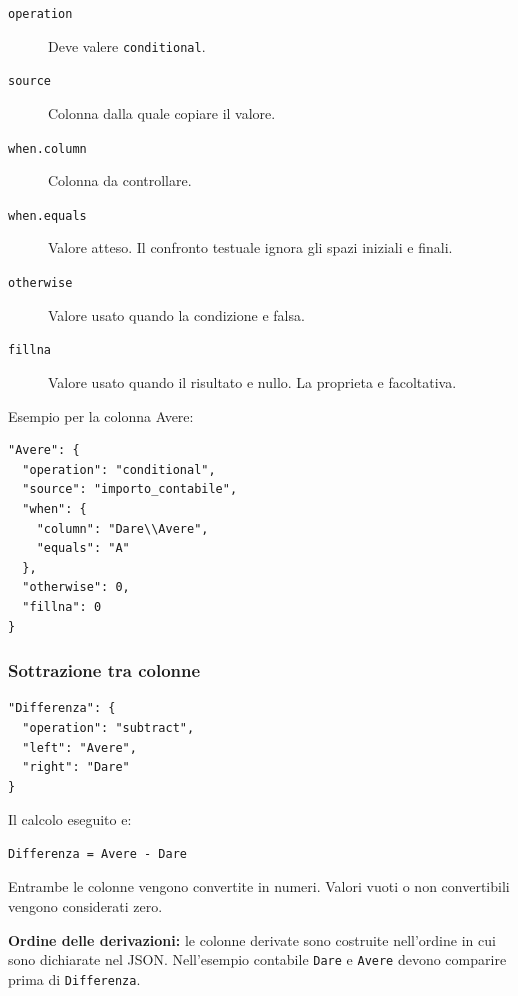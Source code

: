 \begin{description}
  \item[\texttt{operation}]
  Deve valere \texttt{conditional}.

  \item[\texttt{source}]
  Colonna dalla quale copiare il valore.

  \item[\texttt{when.column}]
  Colonna da controllare.

  \item[\texttt{when.equals}]
  Valore atteso. Il confronto testuale ignora gli spazi iniziali e finali.

  \item[\texttt{otherwise}]
  Valore usato quando la condizione e falsa.

  \item[\texttt{fillna}]
  Valore usato quando il risultato e nullo. La proprieta e facoltativa.
\end{description}

Esempio per la colonna Avere:

\begin{lstlisting}
"Avere": {
  "operation": "conditional",
  "source": "importo_contabile",
  "when": {
    "column": "Dare\\Avere",
    "equals": "A"
  },
  "otherwise": 0,
  "fillna": 0
}
\end{lstlisting}

\subsubsection{Sottrazione tra colonne}

\begin{lstlisting}
"Differenza": {
  "operation": "subtract",
  "left": "Avere",
  "right": "Dare"
}
\end{lstlisting}

Il calcolo eseguito e:

\begin{lstlisting}
Differenza = Avere - Dare
\end{lstlisting}

Entrambe le colonne vengono convertite in numeri. Valori vuoti o non
convertibili vengono considerati zero.

\textbf{Ordine delle derivazioni:} le colonne derivate sono costruite
nell'ordine in cui sono dichiarate nel JSON. Nell'esempio contabile
\texttt{Dare} e \texttt{Avere} devono comparire prima di
\texttt{Differenza}.

